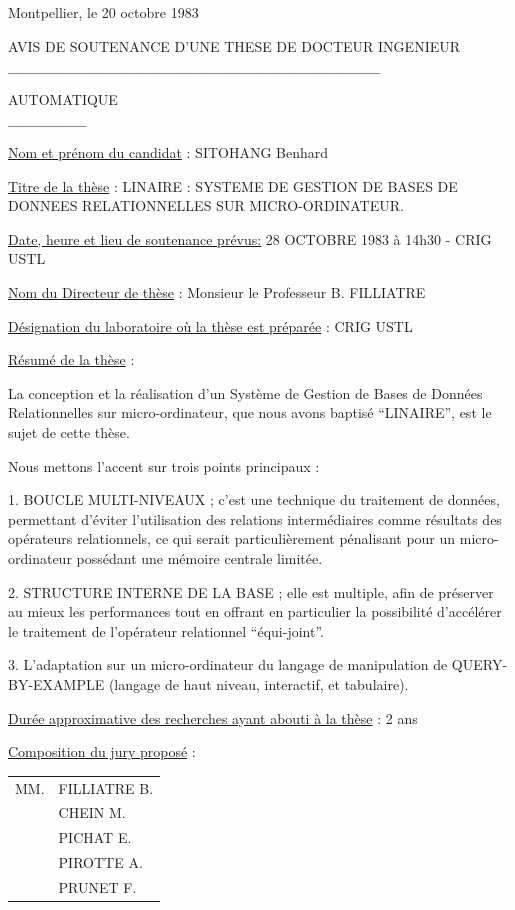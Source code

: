 Montpellier, le 20 octobre 1983

\begin{center}
AVIS DE SOUTENANCE D'UNE THESE DE DOCTEUR INGENIEUR\\
\texttt{\_\_\_\_\_\_\_\_\_\_\_\_\_\_\_\_\_\_\_\_\_\_\_\_\_\_\_\_\_\_\_\_\_\_\_\_\_\_\_\_\_\_\_\_\_\_\_\_\_\_\_\_}

AUTOMATIQUE\\
\texttt{\_\_\_\_\_\_\_\_\_\_\_}
\end{center}

\uline{Nom et prénom du candidat} : SITOHANG Benhard

\uline{Titre de la thèse} : LINAIRE : SYSTEME DE GESTION DE BASES DE DONNEES RELATIONNELLES SUR MICRO-ORDINATEUR.

\uline{Date, heure et lieu de soutenance prévus:} 28 OCTOBRE 1983 à 14h30 - CRIG USTL

\uline{Nom du Directeur de thèse} : Monsieur le Professeur B. FILLIATRE

\uline{Désignation du laboratoire où la thèse est préparée} : CRIG USTL

\uline{Résumé de la thèse} :

La conception et la réalisation d'un Système de Gestion de Bases de Données Relationnelles sur micro-ordinateur, que nous avons baptisé ``LINAIRE'', est le sujet de cette thèse.

Nous mettons l'accent sur trois points principaux :

1. BOUCLE MULTI-NIVEAUX ; c'est une technique du traitement de données, permettant d'éviter l'utilisation des relations intermédiaires comme résultats des opérateurs relationnels, ce qui serait particulièrement pénalisant pour un micro-ordinateur possédant une mémoire centrale limitée.

2. STRUCTURE INTERNE DE LA BASE ; elle est multiple, afin de préserver au mieux les performances tout en offrant en particulier la possibilité d'accélérer le traitement de l'opérateur relationnel ``équi-joint''.

3. L'adaptation sur un micro-ordinateur du langage de manipulation de QUERY-BY-EXAMPLE (langage de haut niveau, interactif, et tabulaire).

\uline{Durée approximative des recherches ayant abouti à la thèse} : 2 ans

\uline{Composition du jury proposé} :

\begin{tabular}{ll}
MM. & FILLIATRE B.\\
& CHEIN M.\\
& PICHAT E.\\
& PIROTTE A.\\
& PRUNET F.
\end{tabular}

